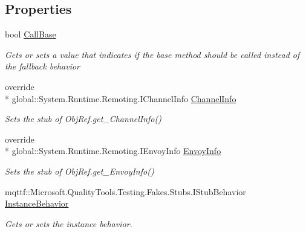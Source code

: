 \subsection*{Properties}
\begin{DoxyCompactItemize}
\item 
bool \hyperlink{class_system_1_1_runtime_1_1_remoting_1_1_fakes_1_1_stub_obj_ref_a6d47298fbc67765d8c437e54abc67436}{Call\-Base}
\begin{DoxyCompactList}\small\item\em Gets or sets a value that indicates if the base method should be called instead of the fallback behavior\end{DoxyCompactList}\item 
override \\*
global\-::\-System.\-Runtime.\-Remoting.\-I\-Channel\-Info \hyperlink{class_system_1_1_runtime_1_1_remoting_1_1_fakes_1_1_stub_obj_ref_a2a0cc723a5c24c70bb1d515568ef44f8}{Channel\-Info}
\begin{DoxyCompactList}\small\item\em Sets the stub of Obj\-Ref.\-get\-\_\-\-Channel\-Info()\end{DoxyCompactList}\item 
override \\*
global\-::\-System.\-Runtime.\-Remoting.\-I\-Envoy\-Info \hyperlink{class_system_1_1_runtime_1_1_remoting_1_1_fakes_1_1_stub_obj_ref_a6b9da8d70ce66e8bb4f774c65b0eeee8}{Envoy\-Info}
\begin{DoxyCompactList}\small\item\em Sets the stub of Obj\-Ref.\-get\-\_\-\-Envoy\-Info()\end{DoxyCompactList}\item 
mqttf\-::\-Microsoft.\-Quality\-Tools.\-Testing.\-Fakes.\-Stubs.\-I\-Stub\-Behavior \hyperlink{class_system_1_1_runtime_1_1_remoting_1_1_fakes_1_1_stub_obj_ref_a837205591f20278a399345b688b3da43}{Instance\-Behavior}
\begin{DoxyCompactList}\small\item\em Gets or sets the instance behavior.\end{DoxyCompactList}\item 

\end{DoxyCompactItemize}
